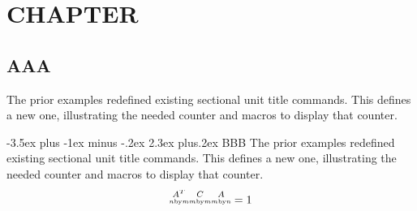 \documentclass[
  class=book,
]{../code/zlatex}
\makeatletter
\newcounter{sector}
\newcommand{\sector}{\@startsection{sector}{1}{0pt}%
  {-3.5ex plus -1ex minus -.2ex}
  {2.3ex plus.2ex}
  {\large\sffamily}%
}
\makeatother
\begin{document}
\chapter{CHAPTER}
\section{AAA}
The prior examples redefined existing sectional unit title 
commands. This defines a new one, illustrating the needed 
counter and macros to display that counter.


\sector{BBB}
The prior examples redefined existing sectional unit title 
commands. This defines a new one, illustrating the needed 
counter and macros to display that counter.



\begin{align}
  \substack{\smash{A^T}\\\scriptscriptstyle n\text{by}m}
  \substack{\smash{C}\\\scriptscriptstyle m\text{by}m}
  \substack{\smash{A}\\\scriptscriptstyle m\text{by}n}
  = 1
\end{align}
\end{document}
